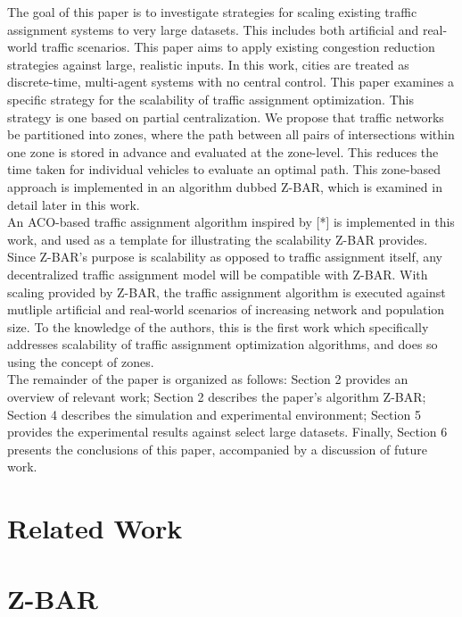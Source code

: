\documentclass[conference]{IEEEtran}
\begin{document}
The goal of this paper is to investigate strategies for scaling existing traffic assignment systems to very large datasets. This includes both artificial and real-world traffic scenarios. This paper aims to apply existing congestion reduction strategies against large, realistic inputs. In this work, cities are treated as discrete-time, multi-agent systems with no central control. This paper examines a specific strategy for the scalability of traffic assignment optimization. This strategy is one based on partial centralization. We propose that traffic networks be partitioned into zones, where the path between all pairs of intersections within one zone is stored in advance and evaluated at the zone-level. This reduces the time taken for individual vehicles to evaluate an optimal path. This zone-based approach is implemented in an algorithm dubbed Z-BAR, which is examined in detail later in this work. \\

An ACO-based traffic assignment algorithm inspired by [*] is implemented in this work, and used as a template for illustrating the scalability Z-BAR provides. Since Z-BAR's purpose is scalability as opposed to traffic assignment itself, any decentralized traffic assignment model will be compatible with Z-BAR. With scaling provided by Z-BAR, the traffic assignment algorithm is executed against mutliple artificial and real-world scenarios of increasing network and population size. To the knowledge of the authors, this is the first work which specifically addresses scalability of traffic assignment optimization algorithms, and does so using the concept of zones. \\

The remainder of the paper is organized as follows: Section 2 provides an overview of relevant work; Section 2 describes the paper's algorithm Z-BAR; Section 4 describes the simulation and experimental environment; Section 5 provides the experimental results against select large datasets. Finally, Section 6 presents the conclusions of this paper, accompanied by a discussion of future work.


\section{Related Work} %

\section{Z-BAR} %
\end{document}
